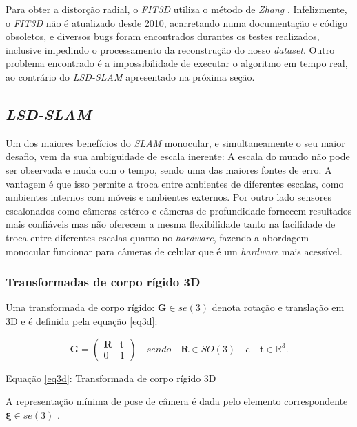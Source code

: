  Para obter a distorção radial, o \textit{FIT3D} utiliza o método de \textit{Zhang} \cite{FIT3D}. Infelizmente, o \textit{FIT3D} não é atualizado desde 2010, acarretando numa documentação e código obsoletos, e diversos bugs foram encontrados durantes os testes realizados, inclusive impedindo o processamento da reconstrução do nosso \textit{dataset}. Outro problema encontrado é a impossibilidade de executar o algoritmo em tempo real, ao contrário do \textit{LSD-SLAM} apresentado na próxima seção.

\subsection{\textit{LSD-SLAM}}

Um dos maiores benefícios do \textit{SLAM} monocular, e simultaneamente o seu maior desafio, vem da sua ambiguidade de escala inerente: A escala do mundo não pode ser observada e muda com o tempo, sendo uma das maiores fontes de erro. A vantagem é que isso permite a troca entre ambientes de diferentes escalas, como ambientes internos com móveis e ambientes externos. Por outro lado sensores escalonados como câmeras estéreo e câmeras de profundidade fornecem resultados mais confiáveis mas não oferecem a mesma flexibilidade tanto na facilidade de troca entre diferentes escalas quanto no \textit{hardware}, fazendo a abordagem monocular funcionar para câmeras de celular que é um \textit{hardware} mais acessível. 

\subsubsection{Transformadas de corpo rígido 3D}

Uma transformada de corpo rígido: $\mathbf{G} \in se(3)$ denota rotação e translação em 3D e é definida pela equação \eqref{eq3d}: 

\begin{equation}\label{eq3d}
	\mathbf{G} = \begin{pmatrix}
	\mathbf{R} & \mathbf{t} \\
	0 & 1\end{pmatrix}
\quad sendo \quad \mathbf{R} \in SO(3) \quad e \quad \mathbf{t} \in \mathbb{R}^3.
\end{equation}

Equação \eqref{eq3d}: Transformada de corpo rígido 3D

A representação mínima de pose de câmera é dada pelo elemento correspondente $\mathbf{\xi} \in se(3)$ \cite[p. 4]{LSD-SLAM-Artigo}.

